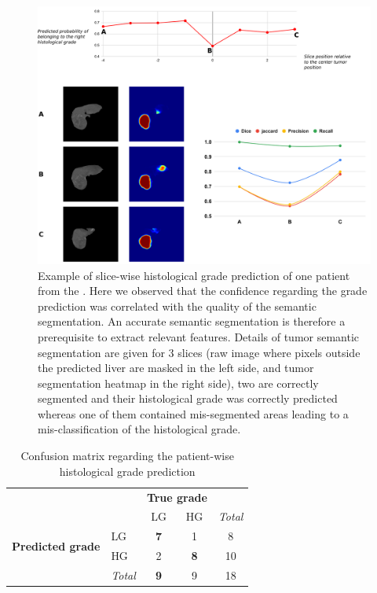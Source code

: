 \begin{figure}[th!]
\centering
\includegraphics[width=0.9\linewidth]{HistologicalGradePrediction/images/Slice_hist_grad_prediction_details}
\caption{Example of slice-wise histological grade prediction of one patient from the . Here we observed that the confidence regarding the grade prediction was correlated with the quality of the semantic segmentation. An accurate semantic segmentation is therefore a prerequisite to extract relevant features. Details of tumor semantic segmentation are given for 3 slices (raw image where pixels outside the predicted liver are masked in the left side, and tumor segmentation heatmap in the right side), two are correctly segmented and their histological grade was correctly predicted whereas one of them contained mis-segmented areas leading to a mis-classification of the histological grade.}
\label{fig:Slice_hist_grad_prediction_details}
\end{figure}




\renewcommand{\arraystretch}{2}
\begin{table}[!htp]\centering
\caption{Confusion matrix regarding the patient-wise histological grade prediction}\label{tab:confusion_matrix}
\begin{tabular}{l|l|c|c|c}
\multicolumn{2}{c}{}&\multicolumn{2}{c}{\textbf{True grade}}&\\
\cline{3-4}
\multicolumn{2}{c|}{}&LG&HG&\multicolumn{1}{c}{\textit{Total}}\\
\cline{2-4}
\multirow{2}{*}{\textbf{Predicted grade}}& LG & \textbf{7} & 1 & 8\\
\cline{2-4}
& HG & 2 & \textbf{8} & 10 \\
\cline{2-4}
\multicolumn{1}{c}{} & \multicolumn{1}{c}{\textit{Total}} & \multicolumn{1}{c}{\textbf{9}} & \multicolumn{1}{c}{9} & \multicolumn{1}{c}{18}\\
\end{tabular}
\end{table}
\renewcommand{\arraystretch}{5}

